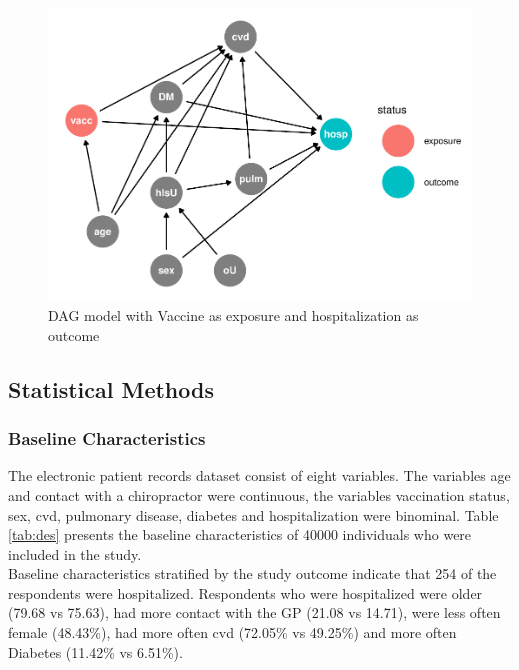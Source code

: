 \documentclass[
]{article}
\begin{document}
\begin{figure}
\includegraphics[width=0.5\linewidth]{Assignment_files/figure-latex/dag-1} \caption{DAG model with Vaccine as exposure and hospitalization as outcome}\label{fig:dag}
\end{figure}

\hypertarget{statistical-methods}{%
\subsection{Statistical Methods}\label{statistical-methods}}

\hypertarget{baseline-characteristics}{%
\subsubsection{Baseline Characteristics}\label{baseline-characteristics}}

The electronic patient records dataset consist of eight variables. The variables age and contact with a chiropractor were continuous, the variables vaccination status, sex, cvd, pulmonary disease, diabetes and hospitalization were binominal. Table \ref{tab:des} presents the baseline characteristics of 40000 individuals who were included in the study.\\
\hspace*{0.333em}\hspace*{0.333em}Baseline characteristics stratified by the study outcome indicate that 254 of the respondents were hospitalized. Respondents who were hospitalized were older (79.68 vs 75.63), had more contact with the GP (21.08 vs 14.71), were less often female (48.43\%), had more often cvd (72.05\% vs 49.25\%) and more often Diabetes (11.42\% vs 6.51\%).
\end{document}
